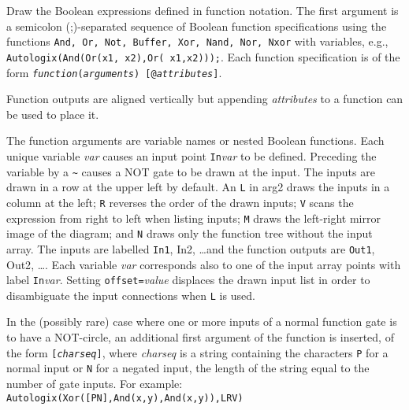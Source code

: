   {Draw the Boolean expressions defined in function notation.
   The first argument is a semicolon (;)-separated sequence of
   Boolean function specifications using the functions
   {\tt And, Or, Not, Buffer, Xor, Nand, Nor, Nxor}%
   with variables, e.g.,
   {\tt Autologix(And(Or(x1,~x2),Or(~x1,x2)));}.
   Each function specification is of the form
   {\tt {\sl function}({\sl arguments}) [@{\sl attributes}]}.
   \par
   Function outputs are aligned vertically but appending
   {\tt@}{\sl attributes} to a function can be used to place it.
   \par
   The function arguments are variable names or nested Boolean functions.
   Each unique variable {\sl var} causes an input point {\tt In}{\sl var}%
   to be defined.  Preceding the variable by a {\tt \~{}} causes a NOT gate
   to be drawn at the input.
   The inputs are drawn in a row at the upper left by default.
   An {\tt L} in arg2 draws the inputs in a column at the left;
   {\tt R} reverses the order of the drawn inputs;
   {\tt V} scans the expression from right to left
   when listing inputs;
   {\tt M} draws the left-right mirror image of the diagram;
   and {\tt N} draws only the function tree without the input array.
   The inputs are labelled {\tt In1}, {In2}, \ldots and the function
   outputs are {\tt Out1}, {Out2}, \dots.
   Each variable {\sl var} corresponds also to one of the input array
   points with label {\tt In}{\sl var}.
   Setting {\tt offset=}{\sl value} displaces the
   drawn input list in order to disambiguate the input connections when {\tt L}%
   is used.
   \par
   In the (possibly rare) case where one or more inputs of a normal function
   gate is to have a NOT-circle, an additional first argument of the function
   is inserted, of the form {\tt [{\sl charseq}]}, where {\sl charseq}%
   is a string containing the characters {\tt P} for a normal input or
   {\tt N} for a negated input, the length of the string equal to the number
   of gate inputs.  For example:
   {\tt Autologix(Xor([PN],And(x,y),And(x,y)),LRV)}}%

